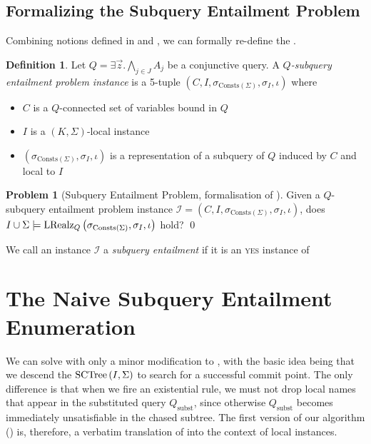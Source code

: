 \documentclass[12pt]{report}
\theoremstyle{plain}
\theoremstyle{definition}
\newtheorem{problem}[theorem]{Problem}
\newtheorem{definition}[theorem]{Definition}
\def\Consts{{\mathrm{Consts}}}
\newcommand{\SCTree}[2]{\ensuremath{\normalfont{\textrm{SCTree}} \left( #1, #2 \right)}}
\newcommand{\LRealz}[2]{\ensuremath{\normalfont{\textrm{LRealz}}_{ #1 } \left( #2 \right)}}
\begin{document}
\subsection{Formalizing the Subquery Entailment Problem}

Combining notions defined in  and , we can formally re-define the .

\begin{definition}
  Let $Q = \exists \vec{z}. \bigwedge_{j \in J} A_j$ be a conjunctive query. A \emph{$Q$-subquery entailment problem instance} is a 5-tuple $(C, I, \sigma_{\Consts(\Sigma)}, \sigma_I, \iota)$ where
  \begin{itemize}
    \item $C$ is a $Q$-connected set of variables bound in $Q$
    \item $I$ is a $(K, \Sigma)$-local instance
    \item $(\sigma_{\Consts(\Sigma)}, \sigma_I, \iota)$ is a representation of a subquery of $Q$ induced by $C$ and local to $I$
  \end{itemize}
\end{definition}

\begin{problem}[Subquery Entailment Problem, formalisation of ]
\label{subquery-entailment-problem}
  Given a $Q$-subquery entailment problem instance $\mathcal{I} = (C, I, \sigma_{\Consts(\Sigma)}, \sigma_I, \iota)$, does $I \cup \Sigma \models \LRealz{Q}{\sigma_{\Consts(\Sigma)}, \sigma_I, \iota}$ hold?
  \qed
\end{problem}

We call an instance $\mathcal{I}$ a \emph{subquery entailment} if it is an \textsc{yes} instance of 

\section{The Naive Subquery Entailment Enumeration}
\label{section:naive-subquery-entailment-enumeration}

We can solve  with only a minor modification to , with the basic idea being that we descend the $\SCTree{I}{\Sigma}$ to search for a successful commit point. The only difference is that when we fire an existential rule, we must not drop local names that appear in the substituted query $Q_\mathrm{subst}$, since otherwise $Q_\mathrm{subst}$ becomes immediately unsatisfiable in the chased subtree. The first version of our algorithm () is, therefore, a verbatim translation of  into the context of local instances.
\end{document}
